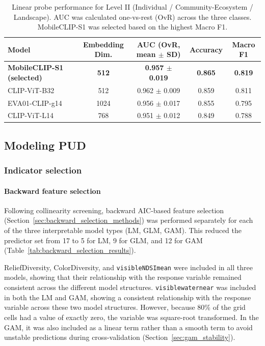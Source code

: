\documentclass[11pt]{article}
\renewcommand{\_}{\textunderscore\allowbreak{}}
\begin{document}
\begin{table}[htbp]
\centering\small
\caption{Linear probe performance for Level II (Individual / Community-Ecosystem / Landscape). AUC was calculated one-vs-rest (OvR) across the three classes. MobileCLIP-S1 was selected based on the highest Macro F1.}
\label{tab:linearprobe_indcoecoland}
\begin{tabular}{@{}lcccc@{}}
\toprule
\textbf{Model} & \textbf{Embedding Dim.} & \textbf{AUC (OvR, mean $\pm$ SD)} & \textbf{Accuracy} & \textbf{Macro F1} \\
\midrule
\textbf{MobileCLIP-S1 (selected)} & \textbf{512}  & \textbf{0.957 $\pm$ 0.019} & \textbf{0.865} & \textbf{0.819} \\
CLIP-ViT-B32              & 512  & 0.962 $\pm$ 0.009 & 0.859 & 0.811 \\
EVA01-CLIP-g14            & 1024 & 0.956 $\pm$ 0.017 & 0.855 & 0.795 \\
CLIP-ViT-L14              & 768  & 0.951 $\pm$ 0.012 & 0.849 & 0.788 \\
\bottomrule
\end{tabular}
\end{table}

\subsection{Modeling PUD}

\subsubsection{Indicator selection}

\paragraph{Backward feature selection}

Following collinearity screening, backward AIC-based feature selection (Section~\ref{sec:backward_selection_methods}) was performed separately for each of the three interpretable model types (LM, GLM, GAM). This reduced the predictor set from 17 to 5 for LM, 9 for GLM, and 12 for GAM (Table~\ref{tab:backward_selection_results}).

ReliefDiversity, ColorDiversity, and \texttt{visible\_NDSI\_mean} were included in all three models, showing that their relationship with the response variable remained consistent across the different model structures. \texttt{visible\_water\_near} was included in both the LM and GAM, showing a consistent relationship with the response variable across these two model structures. However, because 80\% of the grid cells had a value of exactly zero, the variable was square-root transformed. In the GAM, it was also included as a linear term rather than a smooth term to avoid unstable predictions during cross-validation (Section~\ref{sec:gam_stability}).
\end{document}
